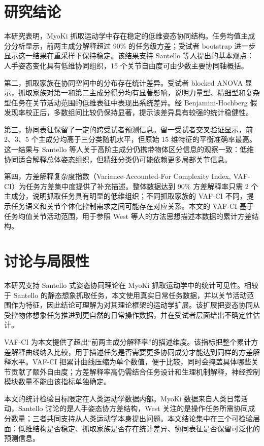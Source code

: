 \documentclass[10pt,a4paper]{ctexart}
\begin{document}
\section{研究结论}
本研究表明，MyoKi 抓取运动学中存在稳定的低维姿态协同结构。任务均值主成分分析显示，前两主成分解释超过 90\% 的任务级方差；受试者 bootstrap 进一步显示这一结果在重采样下保持稳定。该结果支持 Santello 等人提出的基本观点：人手姿态变化具有低维协同组织，15 个关节自由度可由少数主要协同轴概括。

第二，抓取家族在协同空间中的分布存在统计差异。受试者 blocked ANOVA 显示，抓取家族对第一和第二主成分得分均有显著影响，说明力量型、精细型和复杂型任务在关节活动范围的低维表征中表现出系统差异。经 Benjamini-Hochberg 假发现率校正后，多数组间比较仍保持显著，提示该差异具有较强的统计稳健性。

第三，协同表征保留了一定的跨受试者预测信息。留一受试者交叉验证显示，前 2、3、5 个主成分均高于三分类随机水平，但原始 15 维特征的平衡准确率最高。这一结果与 Santello 等人关于高阶主成分仍携带物体区分信息的观察一致：低维协同适合解释总体姿态组织，但精细分类仍可能依赖更多局部关节信息。

第四，方差解释复杂度指数（Variance-Accounted-For Complexity Index, VAF-CI）为任务方差集中度提供了补充描述。整体数据达到 90\% 方差解释率只需 2 个主成分，说明抓取任务具有明显的低维组织；不同抓取家族的 VAF-CI 不同，提示任务语义和关节个体化控制需求之间可能存在对应关系。本文的 VAF-CI 基于任务均值关节活动范围，用于参照 West 等人的方法思想描述本数据的累计方差结构。

\section{讨论与局限性}
本研究支持 Santello 式姿态协同理论在 MyoKi 抓取运动学中的统计可见性。相较于 Santello 的静态想象抓取任务，本文使用真实日常任务数据，并以关节活动范围作为特征，因此结论可理解为对其理论框架的运动学扩展。该扩展把姿态协同从受控物体想象任务推进到更自然的日常操作数据，并在受试者层面给出不确定性估计。

VAF-CI 为本文提供了超出“前两主成分解释率”的描述维度。该指标把整个累计方差解释曲线纳入比较，用于描述任务是否需要更多协同成分才能达到同样的方差解释水平。VAF-CI 把累计曲线压缩为单个数值，便于比较，同时会掩盖具体哪些关节贡献了额外自由度；方差解释率高仍需结合任务设计和生理机制解释，神经控制模块数量不能由该指标单独确定。

本文的统计检验目标限定在人类运动学数据内部。MyoKi 数据来自人类日常活动，Santello 讨论的是人手姿态协方差结构，West 关注的是操作任务所需协同成分数量；三者共同支持从人类运动学本身提出问题。本文结论集中在三个可检验层面：低维结构是否稳定、抓取家族是否存在统计差异、协同表征是否保留可泛化的预测信息。
\end{document}
